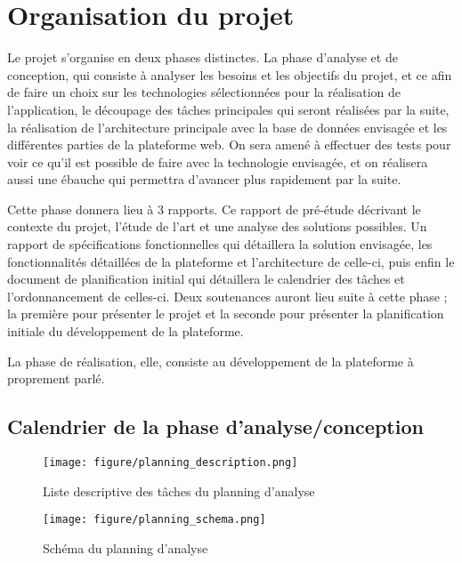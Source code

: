 \section{Organisation du projet}
\label{sec:organisation}
    Le projet s’organise en deux phases distinctes. La phase d’analyse et de conception, qui consiste
    à analyser les besoins et les objectifs du projet, et ce afin de faire un choix sur les technologies
    sélectionnées pour la réalisation de l’application, le découpage des tâches principales qui seront
    réalisées par la suite, la réalisation de l’architecture principale avec la base de données envisagée
    et les différentes parties de la plateforme web. On sera amené à effectuer des tests pour voir ce qu’il
    est possible de faire avec la technologie envisagée, et on réalisera aussi une ébauche qui permettra
    d’avancer plus rapidement par la suite.

    Cette phase donnera lieu à 3 rapports. Ce rapport de pré-étude décrivant le contexte du projet,
    l’étude de l’art et une analyse des solutions possibles. Un rapport de spécifications fonctionnelles
    qui détaillera la solution envisagée, les fonctionnalités détaillées de la plateforme et l’architecture
    de celle-ci, puis enfin le document de planification initial qui détaillera le calendrier des tâches et
    l’ordonnancement de celles-ci. Deux soutenances auront lieu suite à cette phase ; la première pour présenter
    le projet et la seconde pour présenter la planification initiale du développement de la plateforme.

    La phase de réalisation, elle, consiste au développement de la plateforme à proprement parlé.

    \subsection{Calendrier de la phase d’analyse/conception}
    \label{subsec:calendrier}

    \begin{figure}[ht!]
        \centering
        \texttt{[image: figure/planning\_description.png]}
        \caption{Liste descriptive des tâches du planning d'analyse}
        \label{fig:description}
    \end{figure}

    \begin{figure}[ht!]
        \centering
        \texttt{[image: figure/planning\_schema.png]}
        \caption{Schéma du planning d'analyse}
        \label{fig:schema}
    \end{figure}


